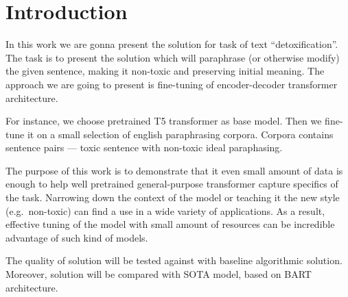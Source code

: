 \section{Introduction}

In this work we are gonna present the solution for task of text
``detoxification''. The task is to present the solution which will paraphrase
(or otherwise modify) the given sentence, making it non-toxic and preserving
initial meaning. The approach we are going to present is fine-tuning of
encoder-decoder transformer architecture.

For instance, we choose pretrained T5 transformer as base model. Then we
fine-tune it on a small selection of english paraphrasing corpora. Corpora
contains sentence pairs --- toxic sentence with non-toxic ideal paraphasing.

The purpose of this work is to demonstrate that it even small amount of data is
enough to help well pretrained general-purpose transformer capture specifics of
the task. Narrowing down the context of the model or teaching it the new style
(e.g.~non-toxic) can find a use in a wide variety of applications. As a result,
effective tuning of the model with small amount of resources can be incredible
advantage of such kind of models.

The quality of solution will be tested against with baseline algorithmic
solution. Moreover, solution will be compared with SOTA model, based on BART
architecture.